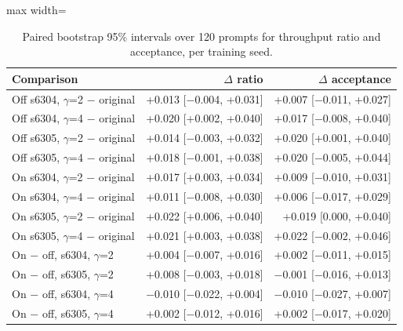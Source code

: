 \begin{table}[!htb]
\centering
\scriptsize
\setlength{\tabcolsep}{3.5pt}
\caption{Paired bootstrap 95\% intervals over 120 prompts for throughput ratio and acceptance, per training seed.}
\label{tab:t3boot}
\begin{adjustbox}{max width=\linewidth}
\begin{tabular}{lrr}
\toprule
Comparison & $\Delta$ ratio & $\Delta$ acceptance \\
\midrule
Off s6304, $\gamma$=2 $-$ original & +0.013 [$-$0.004, +0.031] & +0.007 [$-$0.011, +0.027] \\
Off s6304, $\gamma$=4 $-$ original & +0.020 [+0.002, +0.040] & +0.017 [$-$0.008, +0.040] \\
Off s6305, $\gamma$=2 $-$ original & +0.014 [$-$0.003, +0.032] & +0.020 [+0.001, +0.040] \\
Off s6305, $\gamma$=4 $-$ original & +0.018 [$-$0.001, +0.038] & +0.020 [$-$0.005, +0.044] \\
On s6304, $\gamma$=2 $-$ original & +0.017 [+0.003, +0.034] & +0.009 [$-$0.010, +0.031] \\
On s6304, $\gamma$=4 $-$ original & +0.011 [$-$0.008, +0.030] & +0.006 [$-$0.017, +0.029] \\
On s6305, $\gamma$=2 $-$ original & +0.022 [+0.006, +0.040] & +0.019 [0.000, +0.040] \\
On s6305, $\gamma$=4 $-$ original & +0.021 [+0.003, +0.038] & +0.022 [$-$0.002, +0.046] \\
On $-$ off, s6304, $\gamma$=2 & +0.004 [$-$0.007, +0.016] & +0.002 [$-$0.011, +0.015] \\
On $-$ off, s6305, $\gamma$=2 & +0.008 [$-$0.003, +0.018] & $-$0.001 [$-$0.016, +0.013] \\
On $-$ off, s6304, $\gamma$=4 & $-$0.010 [$-$0.022, +0.004] & $-$0.010 [$-$0.027, +0.007] \\
On $-$ off, s6305, $\gamma$=4 & +0.002 [$-$0.012, +0.016] & +0.002 [$-$0.017, +0.020] \\
\bottomrule
\end{tabular}
\end{adjustbox}
\end{table}

